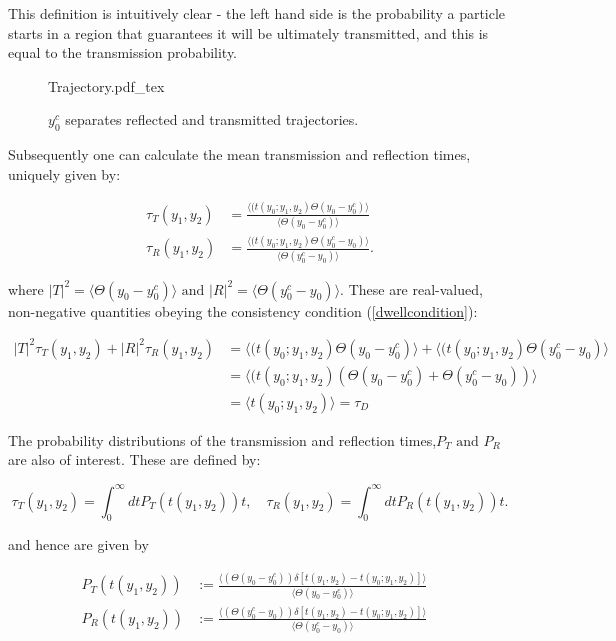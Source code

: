 \documentclass{article}
\newcommand{\incfig}[1]{%
    \def\svgwidth{10cm}
    {#1.pdf_tex}
}
\begin{document}
\noindent This definition is intuitively clear - the left hand side is the probability a particle starts in a region that guarantees it will be ultimately transmitted, and this is equal to the transmission probability.

\begin{figure}[ht]
    \centering
    \incfig{Trajectory}
    \caption{$y_0^c$ separates reflected and transmitted trajectories.}
    \label{fig:trajectories}
\end{figure}

\noindent Subsequently one can calculate the mean transmission and reflection times, uniquely given by:

\begin{align}
	\tau_T(y_1,y_2)&=\frac{\langle(t(y_0;y_1,y_2)\Theta(y_0-y_0^c)\rangle}{\langle\Theta(y_0-y_0^c)\rangle}\\
	\tau_R(y_1,y_2)&=\frac{\langle(t(y_0;y_1,y_2)\Theta(y_0^c-y_0)\rangle}{\langle\Theta(y_0^c-y_0)\rangle}.
\end{align}

\noindent where $|T|^2 = \langle\Theta(y_0-y_0^c)\rangle \text{ and } |R|^2 = \langle\Theta(y_0^c-y_0)\rangle$. These are real-valued, non-negative quantities obeying the consistency condition (\ref{dwellcondition}):

\begin{subequations}
\begin{align}
	|T|^2\tau_T(y_1,y_2)+|R|^2\tau_R(y_1,y_2) &= \langle(t(y_0;y_1,y_2)\Theta(y_0-y_0^c)\rangle+\langle(t(y_0;y_1,y_2)\Theta(y_0^c-y_0)\rangle\\
						  &= \langle(t(y_0;y_1,y_2)(\Theta(y_0-y_0^c)+\Theta(y_0^c-y_0))\rangle\\
						  &= \langle t(y_0;y_1,y_2) \rangle = \tau_D
\end{align}
\end{subequations}

\noindent The probability distributions of the transmission and reflection times,$P_T \text{ and } P_R$ are also of interest. These are defined by:

\begin{equation}
	\tau_T(y_1,y_2) = \int_0^\infty dt P_T(t(y_1,y_2))t, \quad \tau_R(y_1,y_2) = \int_0^\infty dt P_R(t(y_1,y_2))t.
\end{equation}

\noindent and hence are given by

\begin{subequations}
\begin{flalign}
	P_T(t(y_1,y_2))&:=\frac{\langle(\Theta(y_0-y_0^c))\delta[t(y_1,y_2)-t(y_0;y_1,y_2)]\rangle}{\langle\Theta(y_0-y_0^c)\rangle}&\\
	P_R(t(y_1,y_2))&:=\frac{\langle(\Theta(y_0^c-y_0))\delta[t(y_1,y_2)-t(y_0;y_1,y_2)]\rangle}{\langle\Theta(y_0^c-y_0)\rangle}&
\end{flalign}
\end{subequations}
\end{document}
